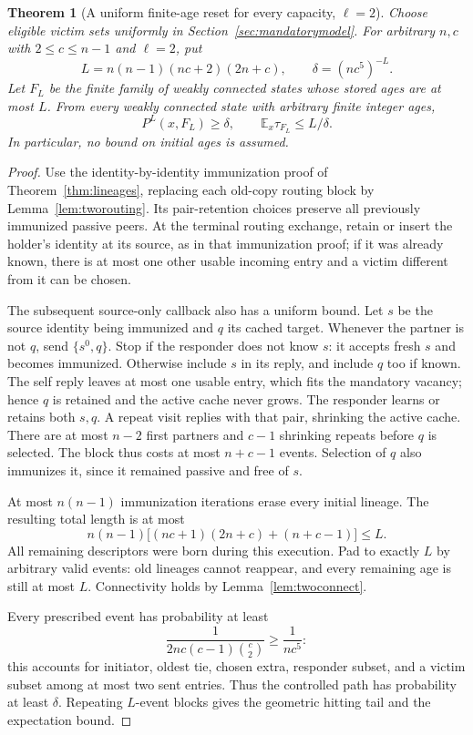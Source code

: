 \documentclass[11pt]{article}
\newtheorem{theorem}{Theorem}
\begin{document}
\begin{theorem}[A uniform finite-age reset for every capacity, $\ell=2$]
\label{thm:tworeset}
Choose eligible victim sets uniformly in
Section~\ref{sec:mandatorymodel}. For arbitrary $n,c$ with
$2\le c\le n-1$ and $\ell=2$, put
\[
 L=n(n-1)(nc+2)(2n+c),\qquad
 \delta=(nc^5)^{-L}.
\]
Let $F_L$ be the finite family of weakly connected states
whose stored ages are at most $L$. From every weakly
connected state with arbitrary finite integer ages,
\[
 P^L(x,F_L)\ge\delta,\qquad
 \mathbb E_x\tau_{F_L}\le L/\delta .
\]
In particular, no bound on initial ages is assumed.
\end{theorem}
\begin{proof}
Use the identity-by-identity immunization proof of
Theorem~\ref{thm:lineages}, replacing each old-copy routing
block by Lemma~\ref{lem:tworouting}. Its pair-retention choices
preserve all previously immunized passive peers.
At the terminal routing exchange, retain or insert the
holder's identity at its source, as in that immunization proof;
if it was already known, there is at most one other usable
incoming entry and a victim different from it can be chosen.

The subsequent source-only callback also has a uniform bound.
Let $s$ be the source identity being immunized and $q$ its
cached target. Whenever the partner is not $q$, send
$\{s^0,q\}$. Stop if the responder does not know $s$:
it accepts fresh $s$ and becomes immunized.
Otherwise include $s$ in its reply, and include $q$ too if
known. The self reply leaves at most one usable entry,
which fits the mandatory vacancy; hence $q$ is retained
and the active cache never grows. The responder learns or
retains both $s,q$. A repeat visit replies with that pair,
shrinking the active cache. There are at most $n-2$ first
partners and $c-1$ shrinking repeats before $q$ is selected.
The block thus costs at most $n+c-1$ events. Selection of
$q$ also immunizes it, since it remained passive and free of $s$.

At most $n(n-1)$ immunization iterations erase every initial
lineage. The resulting total length is at most
\[
 n(n-1)\bigl[(nc+1)(2n+c)+(n+c-1)\bigr]\le L.
\]
All remaining descriptors were born during this execution.
Pad to exactly $L$ by arbitrary valid events: old lineages
cannot reappear, and every remaining age is still at most $L$.
Connectivity holds by Lemma~\ref{lem:twoconnect}.

Every prescribed event has probability at least
\[
 \frac{1}{2nc(c-1)\binom c2}\ge\frac{1}{nc^5}:
\]
this accounts for initiator, oldest tie, chosen extra,
responder subset, and a victim subset among at most two
sent entries. Thus the controlled path has probability
at least $\delta$. Repeating $L$-event blocks gives the
geometric hitting tail and the expectation bound.
\end{proof}
\end{document}
